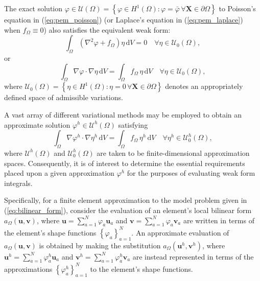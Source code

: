 	The exact solution $\varphi \in \mathcal{U} (\Omega) = \left\{ \varphi \in H^1(\Omega) : \varphi = \bar{\varphi} \, \forall \bm{X} \in \partial \Omega \right\}$ to Poisson's equation in (\ref{eq:pem_poisson}) (or Laplace's equation in (\ref{eq:pem_laplace}) when $f_\Omega \equiv 0$) also satisfies the equivalent weak form:
	\begin{equation}
		\int_\Omega (\nabla^2 \varphi + f_{\Omega}) \eta \, \mathrm dV = 0 \quad \forall \eta \in \mathcal{U}_0 (\Omega),
		\label{eq:initial_weak}
	\end{equation}
	or
	\begin{equation}
		\int_\Omega \nabla \varphi \cdot \nabla \eta \, \mathrm dV = \int_\Omega f_{\Omega} \, \eta \, \mathrm dV \quad \forall \eta \in \mathcal{U}_0 (\Omega),
		\label{eq:weak_bvp}
	\end{equation}
	where $\mathcal{U}_0 (\Omega) = \left\{ \eta \in H^1(\Omega) : \eta = 0 \, \forall \bm{X} \in \partial \Omega \right\}$ denotes an appropriately defined space of admissible variations.
	
	A vast array of different variational methods may be employed to obtain an approximate solution $\varphi^h \in \mathcal{U}^h (\Omega)$ satisfying
	\begin{equation}
		\int_\Omega \nabla \varphi^h \cdot \nabla \eta^h \, \mathrm dV = \int_\Omega f_{\Omega} \, \eta^h \, \mathrm dV \quad \forall \eta^h \in \mathcal{U}^h_0 (\Omega),
		\label{eq:approximate_bvp}
	\end{equation}
	where $\mathcal{U}^h (\Omega)$ and $\mathcal{U}^h_0 (\Omega)$ are taken to be finite-dimensional approximation spaces. Consequently, it is of interest to determine the essential requirements placed upon a given approximation $\varphi^h$ for the purposes of evaluating weak form integrals.
	
	Specifically, for a finite element approximation to the model problem given in (\ref{eq:bilinear_form}), consider the evaluation of an element's local bilinear form $a_{\Omega}(\bm{u},\bm{v})$, where $\bm{u} = \sum_{a=1}^N \varphi_a \bm{u}_a$ and $\bm{v} = \sum_{a=1}^N \varphi_a \bm{v}_a$ are written in terms of the element's shape functions $\left\{ \varphi_a \right\}_{a=1}^N$. An approximate evaluation of $a_{\Omega}(\bm{u},\bm{v})$ is obtained by making the substitution $a_{\Omega}(\bm{u}^h,\bm{v}^h)$, where $\bm{u}^h = \sum_{a=1}^N \varphi^h_a \bm{u}_a$ and $\bm{v}^h = \sum_{a=1}^N \varphi^h_a \bm{v}_a$ are instead represented in terms of the approximations $\left\{ \varphi^h_a \right\}_{a=1}^N$ to the element's shape functions.
	
